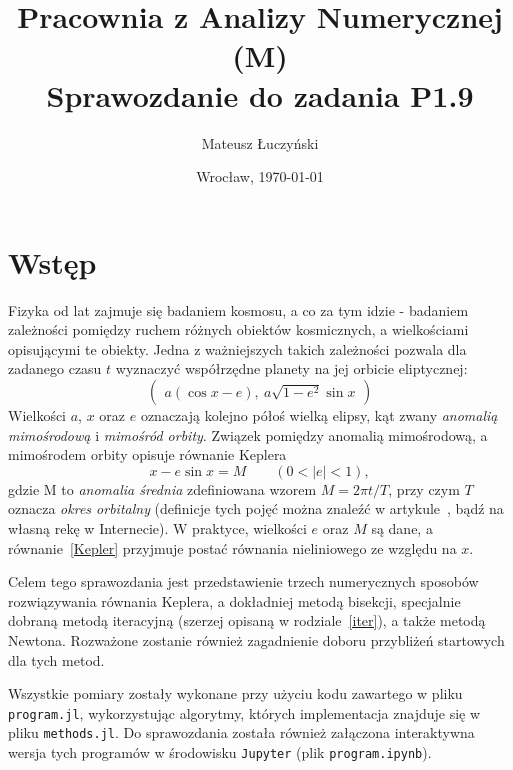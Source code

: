 \documentclass[11pt,wide,leqno]{article}
\title{\textbf{Pracownia z Analizy Numerycznej (M)} \\
        Sprawozdanie do zadania \textbf{P1.9} \\}
\date{Wrocław, \today}
\author{Mateusz Łuczyński}
\begin{document}
    \maketitle
    \thispagestyle{empty}
    \section{Wstęp}
        Fizyka od lat zajmuje się badaniem kosmosu, a co za tym idzie -
        badaniem zależności pomiędzy ruchem różnych obiektów kosmicznych, a wielkościami opisującymi te obiekty.
        Jedna z ważniejszych takich zależności pozwala dla zadanego czasu \(t\) wyznaczyć
        współrzędne planety na jej orbicie eliptycznej:
        \begin{equation}\label{Coordinates}
            \begin{pmatrix}
                a(\cos x - e), \: a\sqrt{1 - e^2}\sin x
            \end{pmatrix}
        \end{equation}
        Wielkości \(a\), \(x\) oraz \(e\) oznaczają kolejno
        półoś wielką elipsy, 
        kąt zwany \textit{anomalią mimośrodową}
        i \textit{mimośród orbity}.
        Związek pomiędzy anomalią mimośrodową, a mimośrodem orbity opisuje 
        równanie Keplera
        \begin{equation}\label{Kepler}
            x - e\sin x = M \qquad (0 < |e| < 1),
        \end{equation}
        gdzie M to \textit{anomalia średnia} zdefiniowana wzorem \(M = 2\pi t/T\),
        przy czym \(T\) oznacza \textit{okres orbitalny}
        (definicje tych pojęć można znaleźć w artykule~\cite{GL}, bądź na własną rekę w Internecie).
        W praktyce, wielkości \(e\) oraz \(M\) są dane, a równanie~\eqref{Kepler}
        przyjmuje postać równania nieliniowego ze względu na \(x\).

        Celem tego sprawozdania jest przedstawienie trzech
        numerycznych sposobów rozwiązywania równania Keplera, a dokładniej 
        metodą bisekcji,
        specjalnie dobraną metodą iteracyjną (szerzej opisaną w rodziale~\ref{iter}),
        a także metodą Newtona. 
        Rozważone zostanie również zagadnienie doboru przybliżeń startowych dla tych metod.

        Wszystkie pomiary zostały wykonane przy użyciu kodu zawartego w pliku
        \texttt{program.jl}, wykorzystując algorytmy, których implementacja znajduje się w pliku
        \texttt{methods.jl}. Do sprawozdania została również załączona
        interaktywna wersja tych programów w środowisku \texttt{Jupyter}
        (plik \texttt{program.ipynb}).
\end{document}

